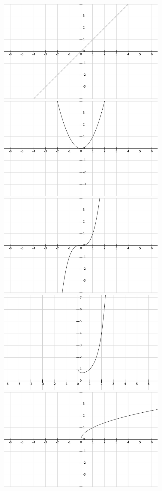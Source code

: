 \documentclass[12pt,a4paper]{article}
\begin{document}
\setlength{\parindent}{0pt}
\pagestyle{empty}
\noindent

\includegraphics[height=5cm]{x.pdf}
\vspace{1em}
\hspace{1em}
\includegraphics[height=5cm]{x^2.pdf}
\vspace{1em}
\includegraphics[height=5cm]{x^3.pdf}
\vspace{1em}
\hspace{1em}
\includegraphics[height=5cm]{x^x.pdf}
\vspace{1em}
\includegraphics[height=5cm]{sqrtx.pdf}
\end{document}

